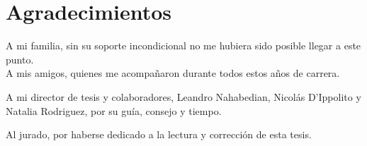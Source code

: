 \chapter*{Agradecimientos}

\noindent
A mi familia, sin su soporte incondicional no me hubiera sido posible llegar a este punto.\\ 
A mis amigos, quienes me acompañaron durante todos estos años de carrera.


\noindent A mi director de tesis y colaboradores, Leandro Nahabedian, Nicolás 
D'Ippolito 
y Natalia Rodriguez, por su guía, consejo y tiempo.

\noindent Al jurado, por haberse dedicado a la lectura y corrección de esta 
tesis.